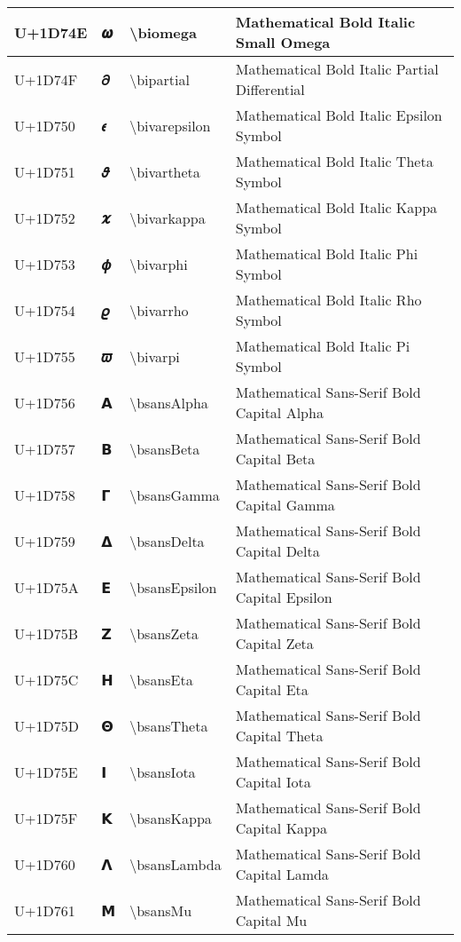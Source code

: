 \begin{table}[h]
\begin{tabulary}{\linewidth}{|L|L|L|L|}
\hline
U+1D74E & 𝝎 & {\textbackslash}biomega & Mathematical Bold Italic Small Omega \\
\hline
U+1D74F & 𝝏 & {\textbackslash}bipartial & Mathematical Bold Italic Partial Differential \\
\hline
U+1D750 & 𝝐 & {\textbackslash}bivarepsilon & Mathematical Bold Italic Epsilon Symbol \\
\hline
U+1D751 & 𝝑 & {\textbackslash}bivartheta & Mathematical Bold Italic Theta Symbol \\
\hline
U+1D752 & 𝝒 & {\textbackslash}bivarkappa & Mathematical Bold Italic Kappa Symbol \\
\hline
U+1D753 & 𝝓 & {\textbackslash}bivarphi & Mathematical Bold Italic Phi Symbol \\
\hline
U+1D754 & 𝝔 & {\textbackslash}bivarrho & Mathematical Bold Italic Rho Symbol \\
\hline
U+1D755 & 𝝕 & {\textbackslash}bivarpi & Mathematical Bold Italic Pi Symbol \\
\hline
U+1D756 & 𝝖 & {\textbackslash}bsansAlpha & Mathematical Sans-Serif Bold Capital Alpha \\
\hline
U+1D757 & 𝝗 & {\textbackslash}bsansBeta & Mathematical Sans-Serif Bold Capital Beta \\
\hline
U+1D758 & 𝝘 & {\textbackslash}bsansGamma & Mathematical Sans-Serif Bold Capital Gamma \\
\hline
U+1D759 & 𝝙 & {\textbackslash}bsansDelta & Mathematical Sans-Serif Bold Capital Delta \\
\hline
U+1D75A & 𝝚 & {\textbackslash}bsansEpsilon & Mathematical Sans-Serif Bold Capital Epsilon \\
\hline
U+1D75B & 𝝛 & {\textbackslash}bsansZeta & Mathematical Sans-Serif Bold Capital Zeta \\
\hline
U+1D75C & 𝝜 & {\textbackslash}bsansEta & Mathematical Sans-Serif Bold Capital Eta \\
\hline
U+1D75D & 𝝝 & {\textbackslash}bsansTheta & Mathematical Sans-Serif Bold Capital Theta \\
\hline
U+1D75E & 𝝞 & {\textbackslash}bsansIota & Mathematical Sans-Serif Bold Capital Iota \\
\hline
U+1D75F & 𝝟 & {\textbackslash}bsansKappa & Mathematical Sans-Serif Bold Capital Kappa \\
\hline
U+1D760 & 𝝠 & {\textbackslash}bsansLambda & Mathematical Sans-Serif Bold Capital Lamda \\
\hline
U+1D761 & 𝝡 & {\textbackslash}bsansMu & Mathematical Sans-Serif Bold Capital Mu \\

\end{tabulary}
\end{table}
